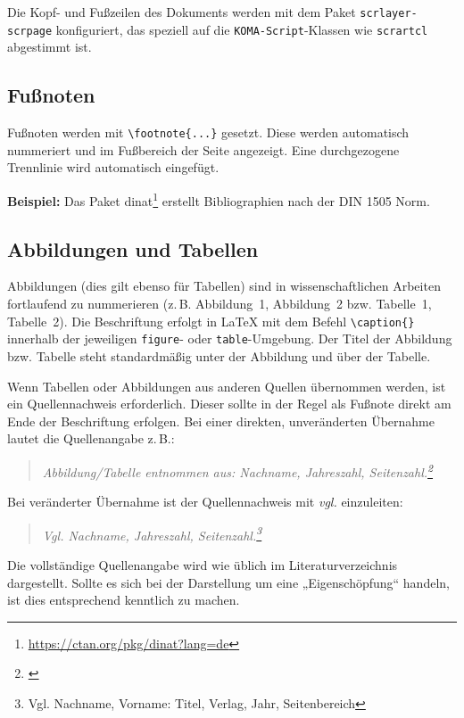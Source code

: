 Die Kopf- und Fußzeilen des Dokuments werden mit dem Paket \texttt{scrlayer-scrpage} konfiguriert, das speziell auf die \texttt{KOMA-Script}-Klassen wie \texttt{scrartcl} abgestimmt ist.

\subsection{Fußnoten}
Fußnoten werden mit \verb|\footnote{...}| gesetzt. Diese werden automatisch nummeriert und im Fußbereich der Seite angezeigt. Eine durchgezogene Trennlinie wird automatisch eingefügt.

\textbf{Beispiel:}
Das Paket dinat\footnote{\url{https://ctan.org/pkg/dinat?lang=de}} erstellt Bibliographien nach der DIN 1505 Norm. 

\subsection{Abbildungen und Tabellen}
Abbildungen (dies gilt ebenso für Tabellen) sind in wissenschaftlichen Arbeiten fortlaufend zu nummerieren (z.\,B. Abbildung~1, Abbildung~2 bzw. Tabelle~1, Tabelle~2). Die Beschriftung erfolgt in LaTeX mit dem Befehl \verb|\caption{}| innerhalb der jeweiligen \verb|figure|- oder \verb|table|-Umgebung. Der Titel der Abbildung bzw. Tabelle steht standardmäßig unter der Abbildung und über der Tabelle.

Wenn Tabellen oder Abbildungen aus anderen Quellen übernommen werden, ist ein Quellennachweis erforderlich. Dieser sollte in der Regel als Fußnote direkt am Ende der Beschriftung erfolgen. Bei einer direkten, unveränderten Übernahme lautet die Quellenangabe z.\,B.: 
\begin{quote}
\textit{Abbildung/Tabelle entnommen aus: Nachname, Jahreszahl, Seitenzahl.\footnote{
\citep[S. 50]{nachname2022buch}}}
\end{quote}

Bei veränderter Übernahme ist der Quellennachweis mit \textit{vgl.} einzuleiten:

\begin{quote}
\textit{Vgl. Nachname, Jahreszahl, Seitenzahl.\footnote{Vgl. Nachname, Vorname: Titel, Verlag, Jahr, Seitenbereich}}
\end{quote}

Die vollständige Quellenangabe wird wie üblich im Literaturverzeichnis dargestellt. Sollte es sich bei der Darstellung um eine „Eigenschöpfung“ handeln, ist dies entsprechend kenntlich zu machen. 

